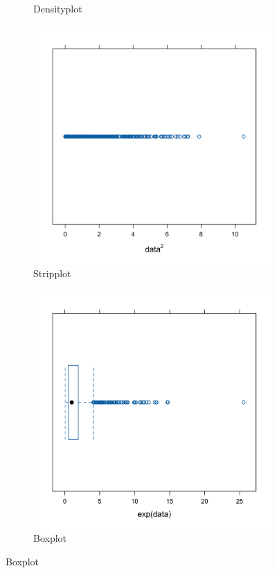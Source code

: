 \documentclass[10pt, a4paper, titlepage]{article}
\begin{document}
\begin{figure}[htbp]
\begin{subfigure}{0.45\textwidth}
        \caption{Densityplot}
        \label{fig:sub2}
    \end{subfigure}
    \vspace{0.5cm}
    \begin{subfigure}{0.45\textwidth}
        \centering
        \includegraphics[width=\textwidth]{stripplot.png}
        \caption{Stripplot}
        \label{fig:sub3}
    \end{subfigure}
    \hfill
    \begin{subfigure}{0.45\textwidth}
        \centering
        \includegraphics[width=\linewidth]{bwplot.png}
        \caption{Boxplot}
        \label{fig:sub4}
    \end{subfigure}
    

\end{figure}
\end{document}
